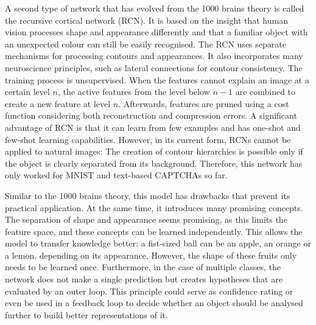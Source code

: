 A second type of network that has evolved from the 1000 brains theory  is called the recursive cortical network (RCN). It is based on the insight that human vision processes shape and appearance differently and that a familiar object with an unexpected colour can still be easily recognised.
The RCN uses separate mechanisms for processing contours and appearances. It also incorporates many neuroscience principles, such as lateral connections for contour consistency.
The training process is unsupervised. When the features cannot explain an image at a certain level $n$, the active features from the level below $n-1$ are combined to create a new feature at level $n$. Afterwards, features are pruned using a cost function considering both reconstruction and compression errors.
A significant advantage of RCN is that it can learn from few examples and has one-shot and few-shot learning capabilities.
However, in its current form, RCNs cannot be applied to natural images: The creation of contour hierarchies is possible only if the object is clearly separated from its background. Therefore, this network has only worked for MNIST and text-based CAPTCHAs so far.

Similar to the 1000 brains theory, this model has drawbacks that prevent its practical application. At the same time, it introduces many promising concepts. The separation of shape and appearance seems promising, as this limits the feature space, and these concepts can be learned independently. This allows the model to transfer knowledge better: a fist-sized ball can be an apple, an orange or a lemon, depending on its appearance. However, the shape of these fruits only needs to be learned once. Furthermore, in the case of multiple classes, the network does not make a single prediction but creates hypotheses that are evaluated by an outer loop. This principle could serve as confidence rating or even be used in a feedback loop to decide whether an object should be analysed further to build better representations of it.

